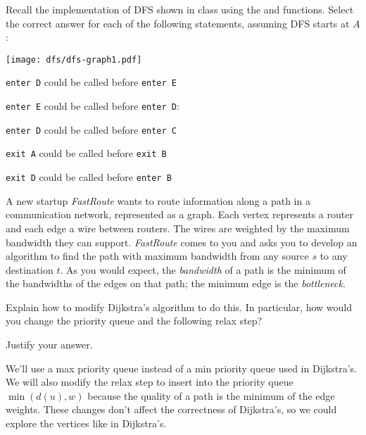 %
\begin{problem}

Recall the implementation of DFS shown in class using the 
and  functions. Select the correct answer for each of the
following statements, assuming DFS starts at $A$:

\begin{center}
  \texttt{[image: dfs/dfs-graph1.pdf]}
\end{center}

\asktf
\texttt{enter D} could be called before \texttt{enter E}

\solt


\asktf
\texttt{enter E} could be called before \texttt{enter D}:
\solt

\asktf
\texttt{enter D} could be called before \texttt{enter C}
\solt

\asktf 
\texttt{exit A} could be called before \texttt{exit B}
\solf

\asktf
\texttt{exit D} could be called before \texttt{enter B}
\solt

\end{problem}

%

\begin{problem}[5.]

A new startup \emph{FastRoute} wants to route information along a path
in a communication network, represented as a graph. Each vertex
represents a router and each edge a wire between routers. The wires
are weighted by the maximum bandwidth they can
support. \emph{FastRoute} comes to you and asks you to develop an
algorithm to find the path with maximum bandwidth from any source $s$
to any destination $t$. As you would expect, the \emph{bandwidth} of a
path is the minimum of the bandwidths of the edges on that path; the
minimum edge is the \emph{bottleneck}.

\ask
Explain how to modify Dijkstra's algorithm to do this. In particular, how would
you change the priority queue and the following relax step?

\begin{quote}
\end{quote}

Justify your answer.

\sol
  We'll use a max priority queue instead of a min priority queue used
  in Dijkstra's. We will also modify the relax step to insert into the
  priority queue $\min(d(u), w)$ because the quality of a path is the
  minimum of the edge weights. These changes don't affect the
  correctness of Dijkstra's, so we could explore the vertices like in
  Dijkstra's.
\end{problem}


